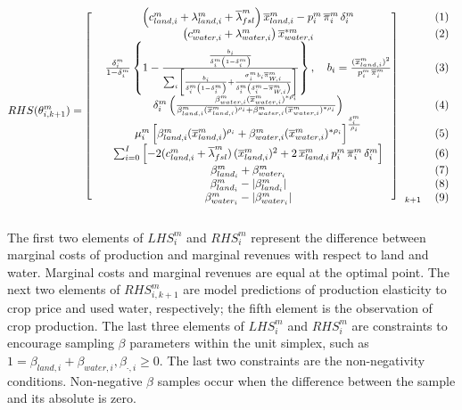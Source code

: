 \begin{equation}
    RHS(\theta_{i,k+1}^{m}) = 
    \begin{blockarray}{cccc}
    \begin{block}{[cc]cc}\label{eq:RHS}
        & \left(c_{land,i}^m + \lambda_{land,i}^m + \overline{\lambda}_{fsl}^m \right) \overline{x}_{land,i}^m - p_i^m\, \overline{\pi}_i^m \,\delta_i^m & &(1)\\
        & \left(c_{water,i}^m + \lambda_{water,i}^m \right) \overline{x}_{water,i}^{*m} & &(2)\\
        & \frac{\delta_i^m} {1 - \delta_i^m} \left\{1 - \frac{\frac{b_i} {\delta_i^m \left(1 - \delta_i^m\right)}}{\sum_{i}\left[\frac{b_{i}}{\delta_i^m\left(1-\delta_i^m \right) } + \frac{\sigma_{i}^m b_i\overline{\pi}_{W,i}^m} {\delta_i^m\left(\delta_i^m - \overline{\pi}_{W,i}^m \right) }\right]}\right\}, \quad b_{i} = \frac{(\overline{x}_{land,i}^{m})^2}{p_{i}^m\,\overline{\pi}_{i}^m}  & &(3)\\
        & \delta_{i}^m\left(\frac{\beta_{water,i}^m(\overline{x}_{water,i }^m)^{*\rho_i}} {\beta_{land,i }^m(\overline{x}_{land,i}^m)^{\rho_i} + \beta_{water,i}^m (\overline{x}_{water,i}^m)^{*\rho_i}} \right) & &(4)\\
        & \mu_i^m \left[\beta_{land,i}^m(\overline{x}_{land,i}^m)^{\rho_i} + \beta_{water,i}^m(\overline{x}_{water,i}^m)^{*\rho_i} \right]^{\frac{\delta_i^m}{\rho_i}} & &(5)\\
        & \sum_{i=0}^I \left[ -2 (c_{land,i}^m + \overline{\lambda}_{fsl}^m)\, (\overline{x}_{land,i}^m)^2 + 2\,\overline{x}_{land,i}^m\,p_i^m\,\overline{\pi}_i^m\,\delta_i^m \right] & &(6)\\
        & \beta_{land_i}^m + \beta_{water_i}^m & &(7)\\
        & \beta_{land_i}^m - \lvert \beta_{land_i}^m \rvert & &(8)\\
        & \beta_{water_i}^m - \lvert \beta_{water_i}^m \rvert &_{k+1} &(9)\\
\end{block}
\end{blockarray}
\end{equation}

The first two elements of $LHS_i^m$ and $RHS_i^m$ represent the difference between marginal costs of production and marginal revenues with respect to land and water. Marginal costs and marginal revenues are equal at the optimal point. The next two elements of $RHS_{i,k+1}^m$ are model predictions of production elasticity to crop price and used water, respectively; the fifth element is the observation of crop production. The last three elements of $LHS_i^m$ and $RHS_i^m$ are constraints to encourage sampling   $\beta$ parameters within the unit simplex, such as $1 = \beta_{land,i} + \beta_{water,i}, \beta_{\cdot,i}\geq 0$. The last two constraints are the non-negativity conditions. Non-negative $\beta$ samples occur when the difference between the sample and its absolute is zero.  


